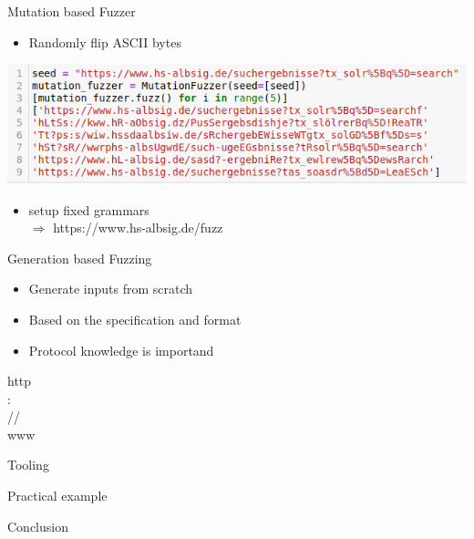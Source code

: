 \documentclass{beamer}
\begin{document}
\begin{frame}{Mutation based Fuzzer}
\begin{itemize}
 \item Randomly flip ASCII bytes
\end{itemize}
 \includegraphics[scale=0.5]{mutatate.png}
\end{frame}
\begin{frame}
 \begin{itemize}
  \item setup fixed grammars\\
  $\Rightarrow$ https://www.hs-albsig.de/fuzz
 \end{itemize}
 
\end{frame}
\begin{frame}{Generation based Fuzzing}
 \begin{itemize}
  \item Generate inputs from scratch
  \item Based on the specification and format
  \item Protocol knowledge is importand
 \end{itemize}
\end{frame}
\begin{frame}
 http\\
 :\\
 //\\
 www\\
 
 
\end{frame}
\begin{frame}{Tooling}
 
\end{frame}
\begin{frame}{Practical example}
 
\end{frame}
\begin{frame}{Conclusion}
 
\end{frame}
\end{document}

